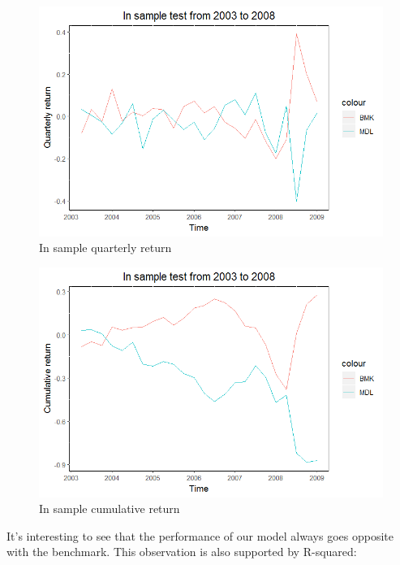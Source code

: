 \documentclass[]{article}
\begin{document}
\begin{figure}[H]
\begin{center}
\includegraphics[width=5in]{Lab//In_sample_qtrly_return.jpg}
\caption{In sample quarterly return}
\label{figure5}
\end{center}
\end{figure}

\begin{figure}[H]
\begin{center}
\includegraphics[width=5in]{Lab//In_sample_cumu_return.jpg}
\caption{In sample cumulative return}
\label{figure6}
\end{center}
\end{figure}

It's interesting to see that the performance of our model always goes
opposite with the benchmark. This observation is also supported by
R-squared:
\end{document}
